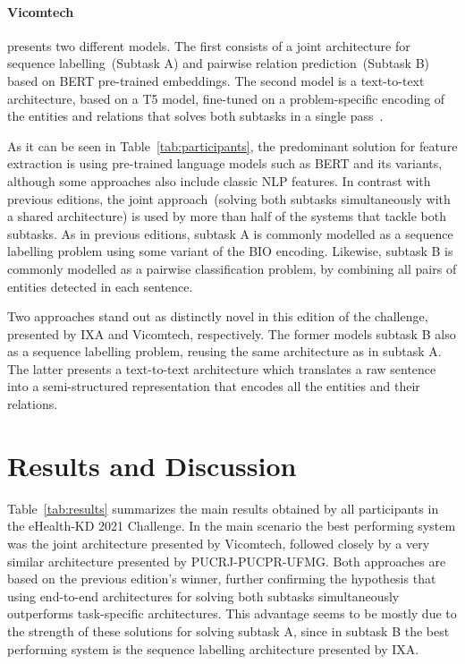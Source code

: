 \documentclass[a4paper,11pt,twocolumn,twoside]{article}
\begin{document}
  \paragraph{Vicomtech} presents two different models. The first consists of a joint architecture for sequence labelling~(Subtask A) and pairwise relation prediction~(Subtask B) based on BERT pre-trained embeddings. The second model is a text-to-text architecture, based on a T5 model, fine-tuned on a problem-specific encoding of the entities and relations that solves both subtasks in a single pass~\cite{vicomtech2021}.

As it can be seen in Table~\ref{tab:participants}, the predominant solution for feature extraction is using pre-trained language models such as BERT and its variants, although some approaches also include classic NLP features.
In contrast with previous editions, the joint approach~(solving both subtasks simultaneously with a shared architecture) is used by more than half of the systems that tackle both subtasks.
As in previous editions, subtask A is commonly modelled as a sequence labelling problem using some variant of the BIO encoding.
Likewise, subtask B is commonly modelled as a pairwise classification problem, by combining all pairs of entities detected in each sentence.

Two approaches stand out as distinctly novel in this edition of the challenge, presented by IXA and Vicomtech, respectively.
The former models subtask B also as a sequence labelling problem, reusing the same architecture as in subtask A.
The latter presents a text-to-text architecture which translates a raw sentence into a semi-structured representation that encodes all the entities and their relations.

\section{Results and Discussion}\label{sec:results}

Table~\ref{tab:results} summarizes the main results obtained by all participants in the eHealth-KD 2021 Challenge.
In the main scenario the best performing system was the joint architecture presented by Vicomtech, followed closely by a very similar architecture presented by PUCRJ-PUCPR-UFMG.
Both approaches are based on the previous edition's winner, further confirming the hypothesis that using end-to-end architectures for solving both subtasks simultaneously outperforms task-specific architectures.
This advantage seems to be mostly due to the strength of these solutions for solving subtask A, since in subtask B the best performing system is the sequence labelling architecture presented by IXA.
\end{document}
